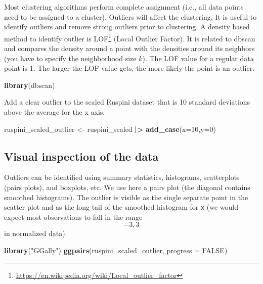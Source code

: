 \documentclass[
  notitlepage]{book}
\newenvironment{Shaded}{\begin{snugshade}}{\end{snugshade}}
\newcommand{\DataTypeTok}[1]{\textcolor[rgb]{0.13,0.29,0.53}{#1}}
\newcommand{\DecValTok}[1]{\textcolor[rgb]{0.00,0.00,0.81}{#1}}
\newcommand{\ErrorTok}[1]{\textcolor[rgb]{0.64,0.00,0.00}{\textbf{#1}}}
\newcommand{\KeywordTok}[1]{\textcolor[rgb]{0.13,0.29,0.53}{\textbf{#1}}}
\newcommand{\NormalTok}[1]{#1}
\newcommand{\OperatorTok}[1]{\textcolor[rgb]{0.81,0.36,0.00}{\textbf{#1}}}
\newcommand{\OtherTok}[1]{\textcolor[rgb]{0.56,0.35,0.01}{#1}}
\newcommand{\StringTok}[1]{\textcolor[rgb]{0.31,0.60,0.02}{#1}}
\DeclareRobustCommand{\href}[2]{#2\footnote{\url{#1}}}
\begin{document}
Most clustering algorithms perform complete assignment (i.e., all data
points need to be assigned to a cluster). Outliers will affect the
clustering. It is useful to identify outliers and remove strong outliers
prior to clustering. A density based method to identify outlier is
\href{https://en.wikipedia.org/wiki/Local_outlier_factor}{LOF} (Local Outlier
Factor). It is related to dbscan and compares the density around a point
with the densities around its neighbors (you have to specify the
neighborhood size \(k\)). The LOF value for a regular data point is 1. The
larger the LOF value gets, the more likely the point is an outlier.

\begin{Shaded}
\begin{Highlighting}[]
\KeywordTok{library}\NormalTok{(dbscan)}
\end{Highlighting}
\end{Shaded}

Add a clear outlier to the scaled Ruspini dataset that is 10 standard
deviations above the average for the x axis.

\begin{Shaded}
\begin{Highlighting}[]
\NormalTok{ruspini\_scaled\_outlier \textless{}{-}}\StringTok{ }\NormalTok{ruspini\_scaled }\OperatorTok{|}\ErrorTok{\textgreater{}}\StringTok{ }\KeywordTok{add\_case}\NormalTok{(}\DataTypeTok{x=}\DecValTok{10}\NormalTok{,}\DataTypeTok{y=}\DecValTok{0}\NormalTok{)}
\end{Highlighting}
\end{Shaded}

\hypertarget{visual-inspection-of-the-data}{%
\subsection{Visual inspection of the data}\label{visual-inspection-of-the-data}}

Outliers can be identified using summary statistics, histograms,
scatterplots (pairs plots), and boxplots, etc. We use here a pairs plot
(the diagonal contains smoothed histograms). The outlier is visible as
the single separate point in the scatter plot and as the long tail of
the smoothed histogram for \texttt{x} (we would expect most observations to
fall in the range \[-3,3\] in normalized data).

\begin{Shaded}
\begin{Highlighting}[]
\KeywordTok{library}\NormalTok{(}\StringTok{"GGally"}\NormalTok{)}
\KeywordTok{ggpairs}\NormalTok{(ruspini\_scaled\_outlier, }\DataTypeTok{progress =} \OtherTok{FALSE}\NormalTok{)}
\end{Highlighting}
\end{Shaded}
\end{document}
